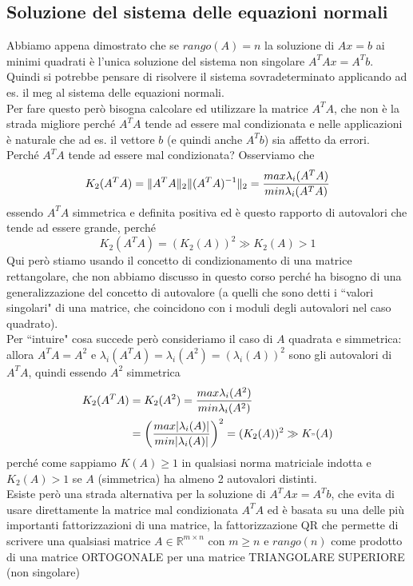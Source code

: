 \documentclass[12pt,a4paper]{article}
\DeclarePairedDelimiter{\norma}{\lVert}{\rVert}
\begin{document}
\subsection{Soluzione del sistema delle equazioni normali}
Abbiamo appena dimostrato che se $rango(A)=n$ la soluzione di $Ax=b$ ai minimi quadrati è l'unica soluzione del sistema non singolare $A^TAx=A^Tb$. \\
Quindi si potrebbe pensare di risolvere il sistema sovradeterminato applicando ad es. il meg al sistema delle equazioni normali. \\
Per fare questo però bisogna calcolare ed utilizzare la matrice $A^TA$, che non è la strada migliore perché $A^TA$ tende ad essere mal condizionata e nelle applicazioni è naturale che ad es. il vettore $b$ (e quindi anche $A^Tb$) sia affetto da errori. \\
Perché $A^TA$ tende ad essere mal condizionata? Osserviamo che 
\begin{equation*}
    K_2(A^TA)=\norma{A^TA}_2\norma{(A^TA)^{-1}}_2 = \frac{max\lambda_i(A^TA)}{min \lambda_i(A^TA)}
\end{equation*}
essendo $A^TA$ simmetrica e definita positiva ed è questo rapporto di autovalori che tende ad essere grande, perché
\begin{equation*}
    K_2(A^TA)=(K_2(A))^2 \gg K_2(A) > 1
\end{equation*}
Qui però stiamo usando il concetto di condizionamento di una matrice rettangolare, che non abbiamo discusso in questo corso perché ha bisogno di una generalizzazione del concetto di autovalore (a quelli che sono detti i ``valori singolari" di una matrice, che coincidono con i moduli degli autovalori nel caso quadrato). \\
Per ``intuire" cosa succede però consideriamo il caso di $A$ quadrata e simmetrica: allora $A^TA=A^2$ e $\lambda_i(A^TA)=\lambda_i(A^2)=(\lambda_i(A))^2$ sono gli autovalori di $A^TA$, quindi essendo $A^2$ simmetrica
\begin{equation*}
    \begin{split}
         K_2(A^TA) & = K_2(A^2)=\frac{max \lambda_i(A^2)}{min \lambda_i(A^2)} \\
         & = \biggl(\frac{max |\lambda_i(A)|}{min |\lambda_i(A)|} \biggr)^2 = (K_2(A))^2 \gg K_"(A)
    \end{split}
\end{equation*}
perché come sappiamo $K(A) \geq 1$ in qualsiasi norma matriciale indotta e $K_2(A) > 1$ se $A$ (simmetrica) ha almeno 2 autovalori distinti. \\
Esiste però una strada alternativa per la soluzione di $A^TAx=A^Tb$, che evita di usare direttamente la matrice mal condizionata $A^TA$ ed è basata su una delle più importanti fattorizzazioni di una matrice, la fattorizzazione QR che permette di scrivere una qualsiasi matrice $A\in \mathbb{R}^{m \times n}$ con $m\geq n$ e $rango(n)$ come prodotto di una matrice ORTOGONALE per una matrice TRIANGOLARE SUPERIORE (non singolare)
\end{document}
